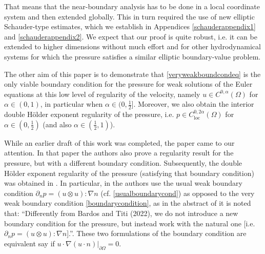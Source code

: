 \documentclass[12pt,a4paper]{article}
\theoremstyle{definition}
\theoremstyle{remark}
\numberwithin{equation}{section}
\begin{document}
That means that the near-boundary analysis has to be done in a local coordinate system and then extended globally. This in turn required the use of new elliptic Schauder-type estimates, which we establish in Appendices \ref{schauderappendix1} and \ref{schauderappendix2}. We expect that our proof is quite robust, i.e. it can be extended to higher dimensions without much effort and for other hydrodynamical systems for which the pressure satisfies a similar elliptic boundary-value problem. 

The other aim of this paper is to demonstrate that \eqref{veryweakboundcondeq} is the only viable boundary condition for the pressure for weak solutions of the Euler equations at this low level of regularity of the velocity, namely $u \in C^{0,\alpha} (\Omega)$ for $\alpha \in (0,1)$, in particular when $\alpha \in (0, \frac{1}{2}]$. Moreover, we also obtain the interior double Hölder exponent regularity of the pressure, i.e. $p \in C^{0,2 \alpha}_{\mathrm{loc}} (\Omega)$ for $\alpha \in (0, \frac{1}{2})$ (and also $\alpha \in (\frac{1}{2},1)$).

While an earlier draft of this work was completed, the paper \cite{derosa} came to our attention. In that paper the authors also prove a regularity result for the pressure, but with a different boundary condition. Subsequently, the double Hölder exponent regularity of the pressure (satisfying that boundary condition) was obtained in \cite{derosa2024}. In particular, in \cite{derosa,derosa2024} the authors use the usual weak boundary condition $\partial_n p = (u \otimes u) : \nabla n$ (cf. \eqref{usualboundarycond}) as opposed to the very weak boundary condition \eqref{boundarycondition}, as in the abstract of \cite{derosa} it is noted that: ``Differently from Bardos and Titi (2022), we do not introduce a new boundary condition for the pressure, but instead work with the natural one [i.e. $\partial_n p = (u \otimes u) : \nabla n$].''. These two formulations of the boundary condition are equivalent say if $u \cdot \nabla (u \cdot n) \lvert_{\partial \Omega} = 0$. 
\end{document}
